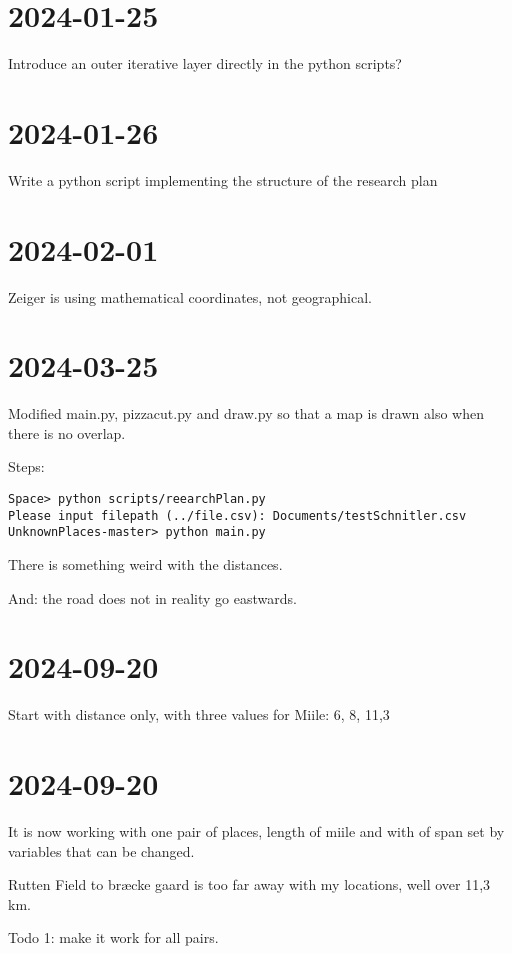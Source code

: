 \documentclass[12pt]{book}
\begin{document}
\section{2024-01-25}

Introduce an outer iterative layer directly in the python scripts?

\section{2024-01-26}

Write a python script implementing the structure of the research plan

\section{2024-02-01}

Zeiger is using mathematical coordinates, not geographical.

\section{2024-03-25}

Modified main.py, pizzacut.py and draw.py so that a map is drawn also when there is no overlap. 

Steps:

\begin{lstlisting}
Space> python scripts/reearchPlan.py
Please input filepath (../file.csv): Documents/testSchnitler.csv
UnknownPlaces-master> python main.py
\end{lstlisting}

There is something weird with the distances.

And: the road does not in reality go eastwards.

\section{2024-09-20}

Start with distance only, with three values for Miile: 6, 8, 11,3

\section{2024-09-20}

It is now working with one pair of places, length of miile and with of span set by variables that can be changed. 

Rutten Field to bræcke gaard is too far away with my locations, well over 11,3 km.

Todo 1: make it work for all pairs.






\end{document}
